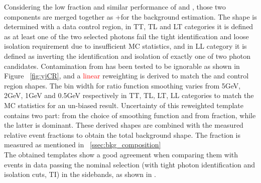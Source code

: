 Considering the low \jetjet fraction and similar performance of \yjet and \jetjet, those two components are merged together as \yjet+\jetjet for the background estimation. The shape is determined with a data control region, in TT, TL and LT categories it is defined as at least one of the two selected photons fail the tight identification and loose isolation requirement due to insufficient MC statistics, and in LL category it is defined as inverting the identification and isolation of exactly one of two photon candidates.
Contamination from \yy has been tested to be ignorable as shown in Figure ~\ref{fig:yjCR}, and a \textcolor{red}{linear} reweighting is derived to match the \yy and control region shapes. The bin width for ratio function smoothing varies from 5GeV, 2GeV, 1GeV and 0.5GeV respectively in TT, TL, LT, LL categories to match the MC statistics for an un-biased result. Uncertainty of this reweighted template contains two part: from the choice of smoothing function and from \yy fraction, while the latter is dominant. 
These derived shapes are combined with the measured relative event fractions to obtain the total background shape. The \yy fraction is measured as mentioned in ~\ref{ssec:bkg_composition} \\

The obtained templates show a good agreement when comparing them with events in data passing the nominal selection (with tight photon identification and isolation cuts, TI) in the sidebands, as shown in \Fig{\ref{fig:BkgData-MC}}.\\

